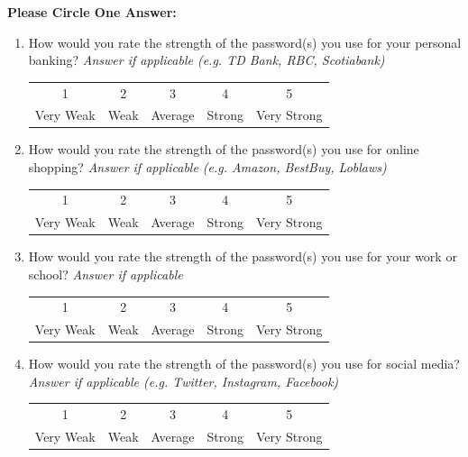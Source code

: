 \documentclass[letterpaper, 10 pt, conference]{ieeeconf}  %
\begin{document}
\textbf{Please Circle One Answer:}

\begin{enumerate}
    \item How would you rate the strength of the password(s) you use for your personal banking? \textit{Answer if applicable (e.g. TD Bank, RBC, Scotiabank)}
        \begin{table}[!htbp]
        \begin{center}
        \begin{tabular}{ccccc}
        1                 & 2        & 3       & 4     & 5              \\
        Very Weak & Weak & Average & Strong & Very Strong
        \end{tabular}
        \end{center}
        \end{table}
    \item How would you rate the strength of the password(s) you use for online shopping? \textit{Answer if applicable (e.g. Amazon, BestBuy, Loblaws)}
        \begin{table}[!htbp]
        \begin{center}
        \begin{tabular}{ccccc}
        1                 & 2        & 3       & 4     & 5              \\
        Very Weak & Weak & Average & Strong & Very Strong
        \end{tabular}
        \end{center}
        \end{table}
    \item How would you rate the strength of the password(s) you use for your work or school? \textit{Answer if applicable}
        \begin{table}[!htbp]
        \begin{center}
        \begin{tabular}{ccccc}
        1                 & 2        & 3       & 4     & 5              \\
        Very Weak & Weak & Average & Strong & Very Strong
        \end{tabular}
        \end{center}
        \end{table}
    \item How would you rate the strength of the password(s) you use for social media? \textit{Answer if applicable (e.g. Twitter, Instagram, Facebook)}
        \begin{table}[!htbp]
        \begin{center}
        \begin{tabular}{ccccc}
        1                 & 2        & 3       & 4     & 5              \\
        Very Weak & Weak & Average & Strong & Very Strong
        \end{tabular}
        \end{center}
        \end{table}
        

\end{enumerate}
\end{document}
